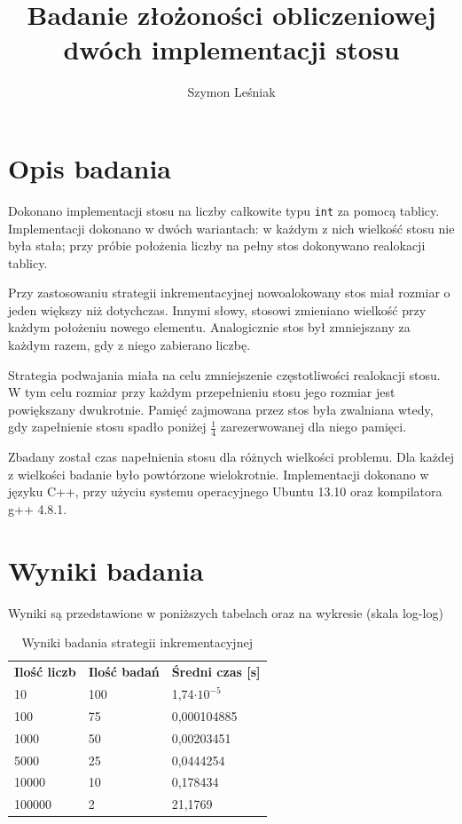 \documentclass[a4paper,10pt]{article}
\title{Badanie złożoności obliczeniowej dwóch implementacji stosu}
\author{Szymon Leśniak}
\begin{document}
\maketitle

\section{Opis badania}

\par Dokonano implementacji stosu na liczby całkowite typu \verb+int+ 
za pomocą tablicy. Implementacji dokonano w dwóch wariantach: w każdym
z nich wielkość stosu nie była stała; przy próbie położenia liczby na
pełny stos dokonywano realokacji tablicy.

\par Przy zastosowaniu strategii inkrementacyjnej nowoalokowany stos miał
rozmiar o jeden większy niż dotychczas. Innymi słowy, stosowi zmieniano 
wielkość przy każdym położeniu nowego elementu. Analogicznie stos był
zmniejszany za każdym razem, gdy z niego zabierano liczbę.

\par Strategia podwajania miała na celu zmniejszenie częstotliwości realokacji
stosu. W tym celu rozmiar przy każdym przepełnieniu stosu jego rozmiar jest
powiększany dwukrotnie. Pamięć zajmowana przez stos była zwalniana wtedy, gdy
zapełnienie stosu spadło poniżej \(\frac{1}{4}\) zarezerwowanej dla niego pamięci.

\par Zbadany został czas napełnienia stosu dla różnych wielkości problemu. 
Dla każdej z wielkości badanie było powtórzone wielokrotnie. Implementacji 
dokonano w języku C++, przy użyciu systemu operacyjnego Ubuntu 13.10 oraz 
kompilatora g++ 4.8.1.

\section{Wyniki badania}

\par Wyniki są przedstawione w poniższych tabelach oraz na wykresie (skala 
log-log) 

\begin{center}
\begin{table}[h]
\caption{Wyniki badania strategii inkrementacyjnej}
\begin{tabular}{lll}
\textbf{Ilość liczb} & \textbf{Ilość badań} & \textbf{Średni czas [s]}\\
10 & 100 & 1,74\(\cdot 10^{-5}\)\\
100 & 75 & 0,000104885\\
1000 & 50 & 0,00203451\\
5000 & 25 & 0,0444254\\
10000 & 10 & 0,178434\\
100000 & 2 & 21,1769
\end{tabular}
\end{table}
\end{center}
\end{document}
